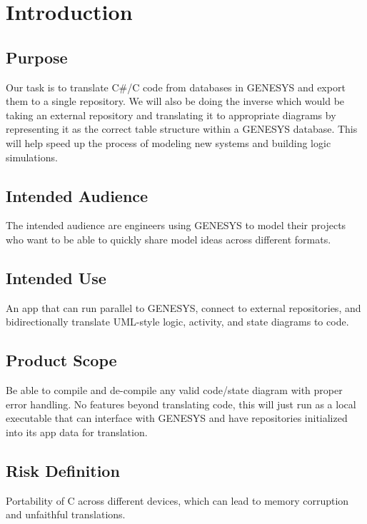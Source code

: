 \chapter{Introduction}
\label{ch:intro}

\section{Purpose }

Our task is to translate C\#/C code from databases in GENESYS and export them to a single repository. We will also be doing the inverse which would be taking an external repository and translating it to appropriate diagrams by representing it as the correct table structure within a GENESYS database. This will help speed up the process of modeling new systems and building logic simulations.

\section{Intended Audience}

The intended audience are engineers using GENESYS to model their projects who want to be able to quickly share model ideas across different formats.  

\section{Intended Use}

An app that can run parallel to GENESYS, connect to external repositories, and bidirectionally translate UML-style logic, activity, and state diagrams to code.

\section{Product Scope}

Be able to compile and de-compile any valid code/state diagram with proper error handling. No features beyond translating code, this will just run as a local executable that can interface with GENESYS and have repositories initialized into its app data for translation.

\section{Risk Definition}

Portability of C across different devices, which can lead to memory corruption and unfaithful translations.  

